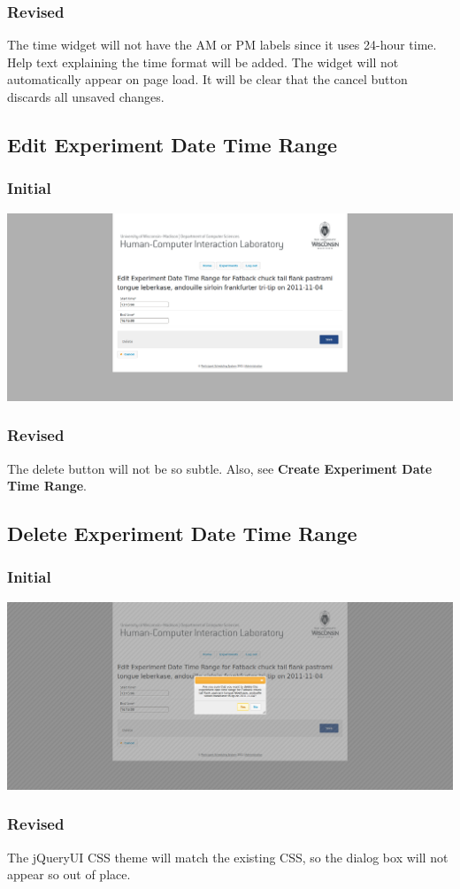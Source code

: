 \subsubsection{Revised}
The time widget will not have the AM or PM labels since it uses 24-hour time. Help text explaining the time format will be added. The widget will not automatically appear on page load. It will be clear that the cancel button discards all unsaved changes.

\subsection{Edit Experiment Date Time Range}
\subsubsection{Initial}
\includegraphics[width=6in]{../other/initial-interface-design/edit-experiment-date-time-range.png}
\subsubsection{Revised}
The delete button will not be so subtle. Also, see \textbf{Create Experiment Date Time Range}.

\subsection{Delete Experiment Date Time Range}
\subsubsection{Initial}
\includegraphics[width=6in]{../other/initial-interface-design/delete-experiment-date-time-range.png}
\subsubsection{Revised}
The jQueryUI CSS theme will match the existing CSS, so the dialog box will not appear so out of place.
